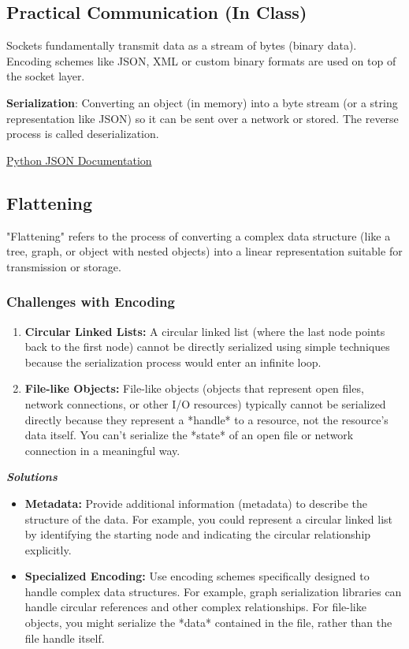 \subsection{Practical Communication (In Class)}
Sockets fundamentally transmit data as a stream of bytes (binary data). Encoding schemes like JSON, XML or custom binary formats are used on top of the socket layer.

\textbf{Serialization}: Converting an object (in memory) into a byte stream (or a string representation like JSON) so it can be sent over a network or stored. The reverse process is called deserialization.

\href{https://docs.python.org/3/library/json.html#json.JSONDecoder}{Python JSON Documentation}

\subsection{Flattening}

"Flattening" refers to the process of converting a complex data structure (like a tree, graph, or object with nested objects) into a linear representation suitable for transmission or storage.

\subsubsection{Challenges with Encoding}
\begin{enumerate}[label=\roman*), itemsep=1pt]
    \item \textbf{Circular Linked Lists:}  A circular linked list (where the last node points back to the first node) cannot be directly serialized using simple techniques because the serialization process would enter an infinite loop.
    \item \textbf{File-like Objects:}  File-like objects (objects that represent open files, network connections, or other I/O resources) typically cannot be serialized directly because they represent a *handle* to a resource, not the resource's data itself.  You can't serialize the *state* of an open file or network connection in a meaningful way.
\end{enumerate}

\textit{\textbf{\large{Solutions}}}

\begin{itemize}
    \item \textbf{Metadata:}  Provide additional information (metadata) to describe the structure of the data.  For example, you could represent a circular linked list by identifying the starting node and indicating the circular relationship explicitly.
    \item \textbf{Specialized Encoding:} Use encoding schemes specifically designed to handle complex data structures.  For example, graph serialization libraries can handle circular references and other complex relationships. For file-like objects, you might serialize the *data* contained in the file, rather than the file handle itself.
\end{itemize}

